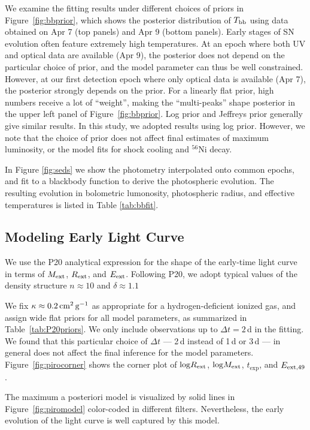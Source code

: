 \documentclass[twocolumn]{aastex63}
\begin{document}
We examine the fitting results under different choices of priors in Figure~\ref{fig:bbprior}, which shows 
the posterior distribution of $T_{\rm bb}$ using data obtained on Apr 7 (top panels) and Apr 9 (bottom 
panels). Early stages of SN evolution often feature extremely high temperatures. At an epoch where 
both UV and optical data are available (Apr 9), the posterior does not depend on the particular choice 
of prior, and the model parameter can thus be well constrained. However, at our first detection epoch 
where only optical data is available (Apr 7), the posterior strongly depends on the prior. For a linearly 
flat prior, high numbers receive a lot of ``weight'', making the ``multi-peaks'' shape posterior in the 
upper left panel of Figure~\ref{fig:bbprior}. Log prior and Jeffreys prior generally give similar results. 
In this study, we adopted results using log prior. However, we note that the choice of prior does not 
affect final estimates of maximum luminosity, or the model fits for shock cooling and $^{56}$Ni decay. 

In Figure \ref{fig:seds} we show the photometry interpolated onto common epochs, and fit to a 
blackbody function to derive the photospheric evolution. The resulting evolution in bolometric 
lumonosity, photospheric radius, and effective temperatures is listed in Table  \ref{tab:bbfit}.

\subsection{Modeling Early Light Curve} \label{subsec:p20fit}

We {\color{red} use the P20 analytical expression for the shape of the early-time light curve in terms 
of $M_{\rm ext}$, $R_{\rm ext}$, and $E_{\rm ext}$. Following P20, we adopt typical values of the 
density structure $n\approx10$ and $\delta\approx1.1$} 

We fix $\kappa \approx 0.2\,{\rm cm^2\, g^{-1}}$ as appropriate for a hydrogen-deficient ionized gas, 
and assign wide flat priors for all model parameters, as summarized in Table~\ref{tab:P20priors}. We 
only include observations up to $\Delta t = 2$\,d in the fitting. We found that this particular choice of 
$\Delta t$ --- 2\,d instead of 1\,d or 3\,d --- in general does not affect the final inference for the model 
parameters. Figure~\ref{fig:pirocorner} shows the corner plot of ${\rm log}R_{\rm ext}$, ${\rm 
log}M_{\rm ext}$, $t_\mathrm{exp}$, and $E_{\rm ext, 
49}$. 

The maximum a posteriori model is visualized by solid lines in Figure~\ref{fig:piromodel} color-coded in 
different filters. Nevertheless, the {\color{red} early evolution} of the light curve is well captured by this 
model.
\end{document}
